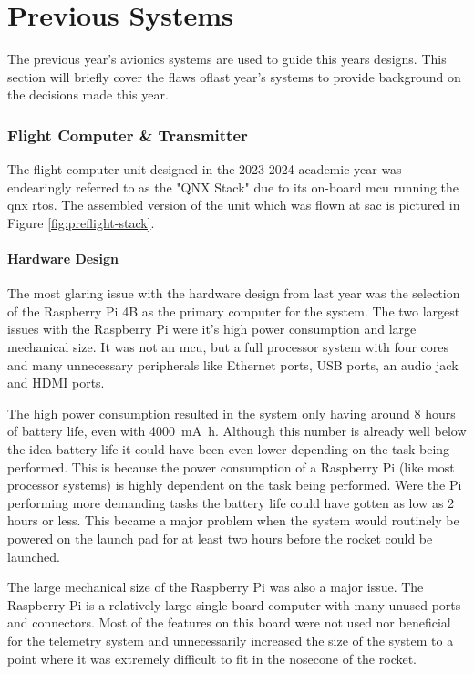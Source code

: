 \part{Previous Systems}

The previous year's avionics systems are used to guide this years designs. This section will briefly cover the flaws
oflast year's systems to provide background on the decisions made this year.

\section{Flight Computer \& Transmitter}

The flight computer unit designed in the 2023-2024 academic year was endearingly referred to as the "QNX Stack" due to
its on-board \gls{mcu} running the \gls{qnx} \gls{rtos}. The assembled version of the unit which was flown at \gls{sac}
is pictured in Figure \ref{fig:preflight-stack}.

\subsection{Hardware Design}

The most glaring issue with the hardware design from last year was the selection of the Raspberry Pi 4B as the primary
computer for the system. The two largest issues with the Raspberry Pi were it's high power consumption and large
mechanical size. It was not an \gls{mcu}, but a full processor system with four cores and many unnecessary peripherals
like Ethernet ports, USB ports, an audio jack and HDMI ports.

The high power consumption resulted in the system only having around 8 hours of battery life, even with
\qty{4000}{\milli\ampere\hour}. Although this number is already well below the idea battery life it could have been even
lower depending on the task being performed. This is because the power consumption of a Raspberry Pi (like most
processor systems) is highly dependent on the task being performed. Were the Pi performing more demanding tasks the
battery life could have gotten as low as 2 hours or less. This became a major problem when the system would routinely
be powered on the launch pad for at least two hours before the rocket could be launched.

The large mechanical size of the Raspberry Pi was also a major issue. The Raspberry Pi is a relatively large single
board computer with many unused ports and connectors. Most of the features on this board were not used nor beneficial
for the telemetry system and unnecessarily increased the size of the system to a point where it was extremely difficult
to fit in the nosecone of the rocket.

